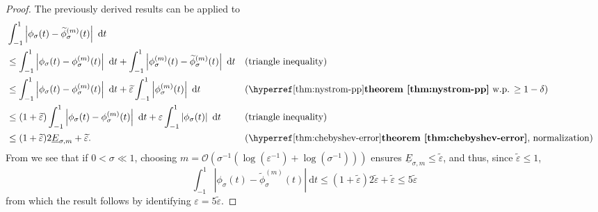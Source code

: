 \begin{proof}
    The previously derived results can be applied to
    \begin{align}
        &\int_{-1}^{1} \left| \phi_{\sigma}(t) - \widetilde{\phi}_{\sigma}^{(m)}(t) \right|~\mathrm{d}t \notag \\
        &\leq \int_{-1}^{1} \left| \phi_{\sigma}(t) - \phi_{\sigma}^{(m)}(t) \right|~\mathrm{d}t + \int_{-1}^{1} \left| \phi^{(m)}_{\sigma}(t) - \widetilde{\phi}_{\sigma}^{(m)}(t) \right|~\mathrm{d}t && \text{(triangle inequality)} \notag \\
        &\leq \int_{-1}^{1} \left| \phi_{\sigma}(t) - \phi_{\sigma}^{(m)}(t) \right|~\mathrm{d}t + \widetilde{\varepsilon} \int_{-1}^{1} \left| \phi^{(m)}_{\sigma}(t) \right|~\mathrm{d}t && \text{(\refthm{thm:nystrom-pp} w.p. $\geq 1 - \delta$)} \notag \\
        &\leq (1 + \widetilde{\varepsilon}) \int_{-1}^{1} \left| \phi_{\sigma}(t) - \phi_{\sigma}^{(m)}(t) \right|~\mathrm{d}t + \varepsilon \int_{-1}^{1} \left| \phi_{\sigma}(t) \right|~\mathrm{d}t && \text{(triangle inequality)} \notag \\
        &\leq (1 + \widetilde{\varepsilon}) 2 \underline{E}_{\sigma, m} + \widetilde{\varepsilon}. && \text{(\refthm{thm:chebyshev-error}, normalization)} \notag \\
    \end{align}
    From  we see that if $0 < \sigma \ll 1$, choosing $m = \mathcal{O}(\sigma^{-1}(\log(\varepsilon^{-1}) + \log(\sigma^{-1})))$ ensures $\underline{E}_{\sigma, m} \leq \widetilde{\varepsilon}$, and thus, since $\widetilde{\varepsilon} \leq 1$,
    \begin{equation}
        \int_{-1}^{1} \left| \phi_{\sigma}(t) - \widetilde{\phi}_{\sigma}^{(m)}(t) \right|~\mathrm{d}t \leq (1+\widetilde{\varepsilon}) 2 \widetilde{\varepsilon} + \widetilde{\varepsilon} \leq 5 \widetilde{\varepsilon}
    \end{equation}
    from which the result follows by identifying $\varepsilon = 5 \widetilde{\varepsilon}$.
\end{proof}



